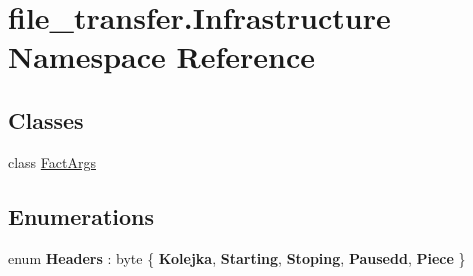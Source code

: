 \hypertarget{namespacefile__transfer_1_1_infrastructure}{}\section{file\+\_\+transfer.\+Infrastructure Namespace Reference}
\label{namespacefile__transfer_1_1_infrastructure}
\subsection*{Classes}
\begin{DoxyCompactItemize}
\item 
class \hyperlink{classfile__transfer_1_1_infrastructure_1_1_fact_args}{Fact\+Args}
\end{DoxyCompactItemize}
\subsection*{Enumerations}
\begin{DoxyCompactItemize}
\item 
\mbox{\label{namespacefile__transfer_1_1_infrastructure_a4311ff24b06028591b8744532dfd2345}} 
enum {\bfseries Headers} \+: byte \{ \newline
{\bfseries Kolejka}, 
{\bfseries Starting}, 
{\bfseries Stoping}, 
{\bfseries Pausedd}, 
\newline
{\bfseries Piece}
 \}
\end{DoxyCompactItemize}
